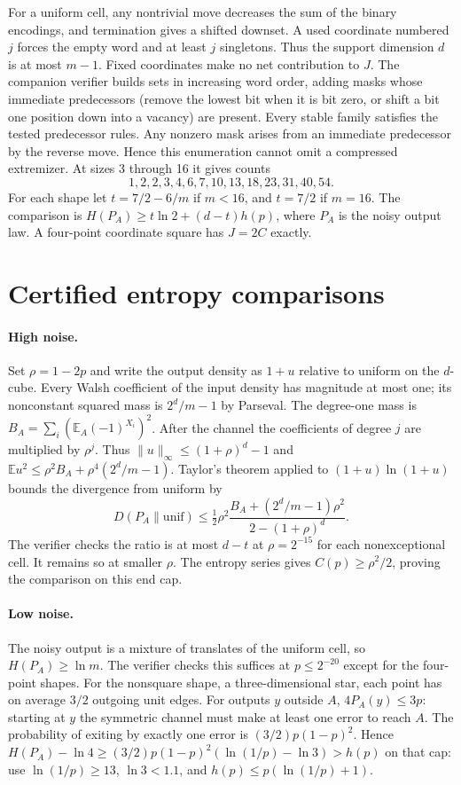 \documentclass[11pt]{article}
\begin{document}
For a uniform cell, any nontrivial move decreases the sum of the binary
encodings, and termination gives a shifted downset. A used coordinate
numbered $j$ forces the empty word and at least $j$ singletons. Thus the
support dimension $d$ is at most $m-1$. Fixed coordinates make no net
contribution to $J$. The companion verifier builds sets in increasing word
order, adding masks whose immediate predecessors (remove the lowest bit
when it is bit zero, or shift a bit one position down into a vacancy) are
present. Every stable family satisfies the tested predecessor rules. Any
nonzero mask arises from an immediate predecessor by the reverse move.
Hence this enumeration cannot omit a compressed extremizer. At sizes
3 through 16 it gives counts
\[
 1,2,2,3,4,6,7,10,13,18,23,31,40,54.
\]
For each shape let $t=7/2-6/m$ if $m<16$, and $t=7/2$ if $m=16$.
The comparison is $H(P_A)\ge t\ln2+(d-t)h(p)$, where $P_A$ is the noisy
output law. A four-point coordinate square has $J=2C$ exactly.

\section{Certified entropy comparisons}
\paragraph{High noise.}
Set $\rho=1-2p$ and write the output density as $1+u$ relative to uniform
on the $d$-cube. Every Walsh coefficient of the input density has magnitude
at most one; its nonconstant squared mass is $2^d/m-1$ by Parseval.
The degree-one mass is $B_A=\sum_i(\mathbb E_A(-1)^{X_i})^2$.
After the channel the coefficients of degree $j$ are multiplied by $\rho^j$.
Thus $\lVert u\rVert_\infty\le(1+\rho)^d-1$ and
$\mathbb E u^2\le\rho^2 B_A+\rho^4(2^d/m-1)$. Taylor's theorem applied to
$(1+u)\ln(1+u)$ bounds the divergence from uniform by
\[
 D(P_A\|\mathrm{unif})\le
 \tfrac12\rho^2\frac{B_A+(2^d/m-1)\rho^2}{2-(1+\rho)^d}.
\]
The verifier checks the ratio is at most $d-t$ at $\rho=2^{-15}$ for
each nonexceptional cell. It remains so at smaller $\rho$. The entropy
series gives $C(p)\ge\rho^2/2$, proving the comparison on this end cap.

\paragraph{Low noise.}
The noisy output is a mixture of translates of the uniform cell, so
$H(P_A)\ge\ln m$. The verifier checks this suffices at $p\le2^{-20}$
except for the four-point shapes. For the nonsquare shape, a three-dimensional
star, each point has on average $3/2$ outgoing unit edges. For outputs $y$
outside $A$, $4P_A(y)\le3p$: starting at $y$ the symmetric channel must make
at least one error to reach $A$. The probability of exiting by exactly one
error is $(3/2)p(1-p)^2$. Hence
$H(P_A)-\ln4\ge(3/2)p(1-p)^2(\ln(1/p)-\ln3)>h(p)$
on that cap: use $\ln(1/p)\ge13$, $\ln3<1.1$, and
$h(p)\le p(\ln(1/p)+1)$.
\end{document}

